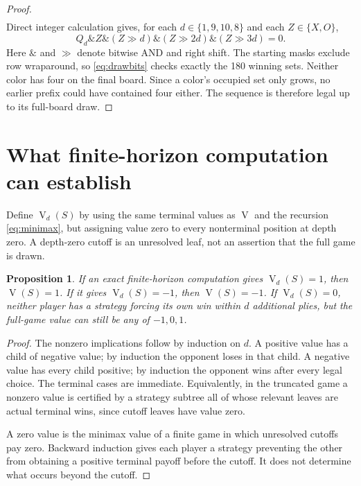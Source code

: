 \documentclass[11pt]{article}
\newtheorem{proposition}[theorem]{Proposition}
\theoremstyle{definition}
\theoremstyle{remark}
\newcommand{\Val}{\operatorname{V}}
\newcommand{\AND}{\mathbin{\&}}
\begin{document}
\begin{proof}
\[\begin{aligned}
\end{aligned}
\]
Direct integer calculation gives, for each $d\in\{1,9,10,8\}$ and each
$Z\in\{X,O\}$,
\begin{equation}\label{eq:drawbits}
 Q_d\AND Z\AND(Z\mathbin{\gg}d)
       \AND(Z\mathbin{\gg}2d)\AND(Z\mathbin{\gg}3d)=0.
\end{equation}
Here $\AND$ and $\gg$ denote bitwise AND and right shift. The starting
masks exclude row wraparound, so \eqref{eq:drawbits} checks exactly the
180 winning sets. Neither color has four on the final board. Since a
color's occupied set only grows, no earlier prefix could have contained
four either. The sequence is therefore legal up to its full-board draw.
\end{proof}

\section[Finite-horizon computation]{What finite-horizon computation can establish}\label{sec:horizon}
Define $\Val_d(S)$ by using the same terminal values as $\Val$ and the
recursion \eqref{eq:minimax}, but assigning value zero to every nonterminal
position at depth zero. A depth-zero cutoff is an unresolved leaf, not an
assertion that the full game is drawn.

\begin{proposition}\label{prop:horizon}
If an exact finite-horizon computation gives $\Val_d(S)=1$, then
$\Val(S)=1$. If it gives $\Val_d(S)=-1$, then $\Val(S)=-1$.
If $\Val_d(S)=0$, neither player has a strategy forcing its own win within
$d$ additional plies, but the full-game value can still be any of
$-1,0,1$.
\end{proposition}
\begin{proof}
The nonzero implications follow by induction on $d$. A positive value
has a child of negative value; by induction the opponent loses in that
child. A negative value has every child positive; by induction the
opponent wins after every legal choice. The terminal cases are immediate.
Equivalently, in the truncated game a nonzero value is certified by a
strategy subtree all of whose relevant leaves are actual terminal wins,
since cutoff leaves have value zero.

A zero value is the minimax value of a finite game in which unresolved
cutoffs pay zero. Backward induction gives each player a strategy
preventing the other from obtaining a positive terminal payoff before the
cutoff. It does not determine what occurs beyond the cutoff.
\end{proof}
\end{document}
